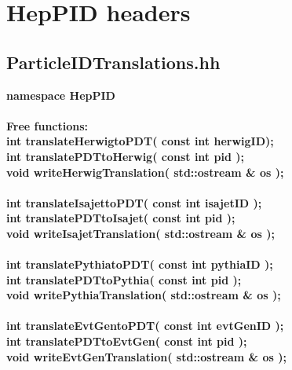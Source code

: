 \section {HepPID headers}
\label{PIDheaders}

\subsection {ParticleIDTranslations.hh}

\begin{tabbing}

{\bf namespace HepPID} \\  \\

{\bf Free functions:} \\
\hspace{0.5in} {\bf int translateHerwigtoPDT( const int herwigID);} \\
\hspace{0.5in} {\bf int translatePDTtoHerwig( const int pid );} \\ 
\hspace{0.5in} {\bf void  writeHerwigTranslation( std::ostream \& os );} \\  \\

\hspace{0.5in} {\bf int translateIsajettoPDT( const int isajetID );} \\
\hspace{0.5in} {\bf int translatePDTtoIsajet( const int pid );} \\ 
\hspace{0.5in} {\bf void  writeIsajetTranslation( std::ostream \& os );} \\  \\

\hspace{0.5in} {\bf int translatePythiatoPDT( const int pythiaID );} \\
\hspace{0.5in} {\bf int translatePDTtoPythia( const int pid );} \\ 
\hspace{0.5in} {\bf void  writePythiaTranslation( std::ostream \& os );} \\  \\

\hspace{0.5in} {\bf int translateEvtGentoPDT( const int evtGenID );} \\
\hspace{0.5in} {\bf int translatePDTtoEvtGen( const int pid );} \\
\hspace{0.5in} {\bf void  writeEvtGenTranslation( std::ostream \& os );} \\  \\


\end{tabbing}
